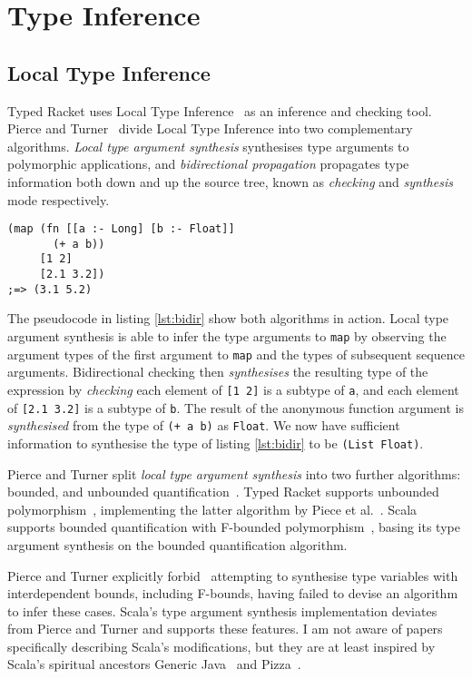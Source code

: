 \section{Type Inference}

\subsection{Local Type Inference}

Typed Racket uses Local Type Inference~\cite{PT00}
as an inference and checking tool. Pierce and Turner~\cite{PT00}
divide Local Type Inference into
two complementary algorithms. \emph{Local type argument synthesis}
synthesises type arguments to polymorphic applications, and \emph{bidirectional
propagation} propagates type information both down and up the source tree,
known as \emph{checking} and \emph{synthesis} mode respectively.

\begin{lstlisting}[caption=Bidirectional checking algorithm with Typed Clojure pseudocode, label=lst:bidir]
(map (fn [[a :- Long] [b :- Float]]
       (+ a b))
     [1 2]
     [2.1 3.2])
;=> (3.1 5.2)
\end{lstlisting}

The pseudocode in listing \ref{lst:bidir} show both algorithms in action. Local type argument synthesis is able
to infer the type arguments to \lstinline|map| by observing the argument types of the first
argument to \lstinline|map| and the types of subsequent sequence arguments. Bidirectional checking
then \emph{synthesises} the resulting type of the expression by \emph{checking} each element
of \lstinline|[1 2]| is a subtype of \lstinline|a|, and each element of \lstinline|[2.1 3.2]| is a subtype of
\lstinline|b|. The result of the anonymous function argument is \emph{synthesised} from the type of
\lstinline|(+ a b)| as \lstinline|Float|. We now have sufficient information to 
synthesise the type of listing \ref{lst:bidir} to be \lstinline|(List Float)|.

Pierce and Turner split \emph{local type argument synthesis} into two further
algorithms: bounded, and unbounded quantification~\cite{PT00}. 
Typed Racket 
supports unbounded polymorphism~\cite{Tob10}, implementing the latter algorithm by Piece et al.\ .
Scala supports bounded quantification with F-bounded polymorphism~\cite{CCHOM89},
basing its type argument synthesis on the bounded quantification algorithm.

Pierce and Turner explicitly forbid~\cite{PT00}
attempting to synthesise type variables with interdependent bounds, including
F-bounds, having failed to devise an algorithm to infer these cases.
Scala's type argument synthesis implementation deviates from Pierce and Turner and supports these features.
I am not aware of papers specifically describing Scala's modifications, but they are at least inspired by
Scala's spiritual ancestors Generic Java~\cite{BOSW98} and Pizza~\cite{OW97}.

